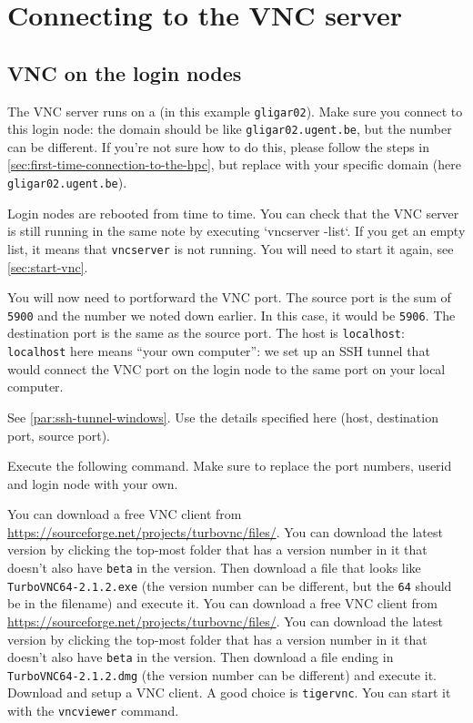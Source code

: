 \section{Connecting to the VNC server}

\subsection{VNC on the login nodes}

The VNC server runs on a  (in this example \lstinline|gligar02|).
Make sure you connect to this login node: the domain should be like \lstinline|gligar02.ugent.be|,
but the number can be different. If you're not sure how to do this, please follow the steps
in \autoref{sec:first-time-connection-to-the-hpc}, but replace \loginnode with your specific
domain (here \lstinline|gligar02.ugent.be|).

Login nodes are rebooted from time to time. You can check that the VNC server is still
running in the same note by executing `vncserver -list`. If you get an empty list,
it means that \lstinline|vncserver| is not running. You will need to start it again,
see \autoref{sec:start-vnc}.

You will now need to portforward the VNC port. The source port is the sum of \lstinline|5900|
and the number we noted down earlier. In this case, it would be \lstinline|5906|.
The destination port is the same as the source port. The host is \lstinline|localhost|:
\lstinline|localhost| here means ``your own computer'': we set up an SSH tunnel that would
connect the VNC port on the login node to the same port on your local computer.

\ifwindows
See \autoref{par:ssh-tunnel-windows}. Use the details specified here (host, destination port,
source port).
\else

Execute the following command. Make sure to replace the port numbers, userid and login node
with your own.

\begin{prompt}
\end{prompt}
\fi

\ifwindows

You can download a free VNC client from \url{https://sourceforge.net/projects/turbovnc/files/}.
You can download the latest version by clicking the top-most folder that has a version number
in it that doesn't also have \lstinline|beta| in the version. Then download a file that looks like
\lstinline|TurboVNC64-2.1.2.exe| (the version number can be different, but the \lstinline|64|
should be in the filename) and execute it.
\fi
\ifmac
You can download a free VNC client from \url{https://sourceforge.net/projects/turbovnc/files/}.
You can download the latest version by clicking the top-most folder that has a version number
in it that doesn't also have \lstinline|beta| in the version. Then download a file ending in
\lstinline|TurboVNC64-2.1.2.dmg| (the version number can be different) and execute it.
\fi
\iflinux
Download and setup a VNC client. A good choice is \lstinline|tigervnc|. You can start
it with the \lstinline|vncviewer| command.
\fi

